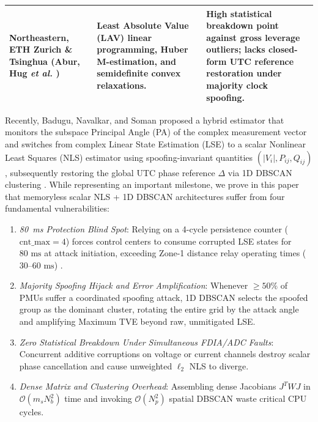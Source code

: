 \documentclass[journal,twoside]{IEEEtran}
\begin{document}
\begin{table}[!t]
\begin{tabular}{p{3.6cm}p{5.2cm}p{8.0cm}}
\addlinespace[2pt]
\textbf{Northeastern, ETH Zurich \& Tsinghua} (Abur, Hug \emph{et al.} \cite{abur2004power,gol2014lav,huber1981robust}) & Least Absolute Value (LAV) linear programming, Huber M-estimation, and semidefinite convex relaxations. & High statistical breakdown point against gross leverage outliers; lacks closed-form UTC reference restoration under majority clock spoofing. \\
\bottomrule
\end{tabular}
\end{table}

Recently, Badugu, Navalkar, and Soman \cite{badugu2026synchrophasor} proposed a hybrid estimator that monitors the subspace Principal Angle (PA) \cite{raju2023mitigation,golub1996matrix} of the complex measurement vector and switches from complex Linear State Estimation (LSE) \cite{phadke1986state} to a scalar Nonlinear Least Squares (NLS) estimator \cite{pandian1999towards} using spoofing-invariant quantities $(|V_i|, P_{ij}, Q_{ij})$, subsequently restoring the global UTC phase reference $\Delta$ via 1D DBSCAN clustering \cite{ester1996density}. While representing an important milestone, we prove in this paper that memoryless scalar NLS + 1D DBSCAN architectures suffer from four fundamental vulnerabilities:
\begin{enumerate}
    \item \emph{80~ms Protection Blind Spot}: Relying on a 4-cycle persistence counter ($\mathrm{cnt\_max}=4$) forces control centers to consume corrupted LSE states for $80\text{~ms}$ at attack initiation, exceeding Zone-1 distance relay operating times ($30\text{--}60\text{~ms}$) \cite{minal2019pmu}.
    \item \emph{Majority Spoofing Hijack and Error Amplification}: Whenever $\ge 50\%$ of PMUs suffer a coordinated spoofing attack, 1D DBSCAN selects the spoofed group as the dominant cluster, rotating the entire grid by the attack angle and amplifying Maximum TVE beyond raw, unmitigated LSE.
    \item \emph{Zero Statistical Breakdown Under Simultaneous FDIA/ADC Faults}: Concurrent additive corruptions on voltage or current channels destroy scalar phase cancellation and cause unweighted $\ell_2$ NLS to diverge.
    \item \emph{Dense Matrix and Clustering Overhead}: Assembling dense Jacobians $J^T W J$ in $\mathcal{O}(m_s N_b^2)$ time and invoking $\mathcal{O}(N_p^2)$ spatial DBSCAN waste critical CPU cycles.
\end{enumerate}
\end{document}
